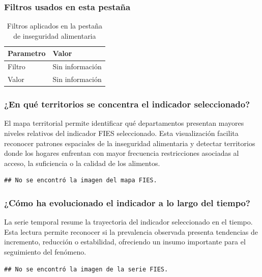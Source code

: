 \documentclass[
]{article}
\begin{document}
\subsubsection{Filtros usados en esta
pestaña}\label{filtros-usados-en-esta-pestauxf1a}

\begin{table}

\caption{\label{tab:unnamed-chunk-1}Filtros aplicados en la pestaña de inseguridad alimentaria}
\centering
\begin{tabular}[t]{p{}p{}}
\toprule
Parametro & Valor\\
\midrule
Filtro & Sin información\\
Valor & Sin información\\
\bottomrule
\end{tabular}
\end{table}

\subsubsection{¿En qué territorios se concentra el indicador
seleccionado?}\label{en-quuxe9-territorios-se-concentra-el-indicador-seleccionado}

El mapa territorial permite identificar qué departamentos presentan
mayores niveles relativos del indicador FIES seleccionado. Esta
visualización facilita reconocer patrones espaciales de la inseguridad
alimentaria y detectar territorios donde los hogares enfrentan con mayor
frecuencia restricciones asociadas al acceso, la suficiencia o la
calidad de los alimentos.

\begin{verbatim}
## No se encontró la imagen del mapa FIES.
\end{verbatim}

\subsubsection{¿Cómo ha evolucionado el indicador a lo largo del
tiempo?}\label{cuxf3mo-ha-evolucionado-el-indicador-a-lo-largo-del-tiempo}

La serie temporal resume la trayectoria del indicador seleccionado en el
tiempo. Esta lectura permite reconocer si la prevalencia observada
presenta tendencias de incremento, reducción o estabilidad, ofreciendo
un insumo importante para el seguimiento del fenómeno.

\begin{verbatim}
## No se encontró la imagen de la serie FIES.
\end{verbatim}
\end{document}
